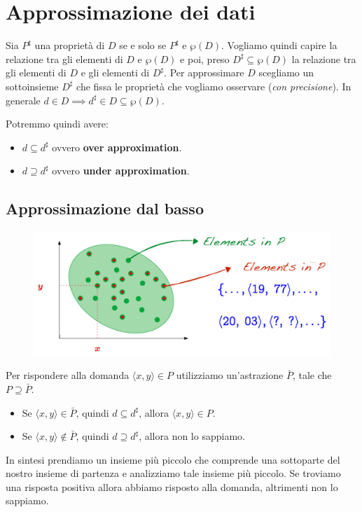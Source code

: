 \section{Approssimazione dei dati}
Sia $P^\sharp$ una proprietà di $D$ se e solo se $P^\sharp$ e $\wp(D)$. Vogliamo quindi capire la relazione tra gli 
elementi di $D$ e $\wp(D)$ e poi, preso $D^\sharp \subseteq \wp(D)$ la relazione tra gli elementi di $D$ e gli elementi 
di $D^\sharp$.
Per approssimare $D$ scegliamo un sottoinsieme $D^\sharp$ che fissa le proprietà che vogliamo osservare (\textit{con precisione}).
In generale $d \in D \implies d^\sharp \in D \subseteq \wp(D)$.

Potremmo quindi avere:
\begin{itemize}
  \item $d \subseteq d^\sharp$ ovvero \textbf{over approximation}.
  \item $d \supseteq d^\sharp$ ovvero \textbf{under approximation}.
\end{itemize}
\subsection{Approssimazione dal basso}
\begin{figure}[H]
  \centering
  \includegraphics[scale=0.5]{img/approx.png}
\end{figure}
Per rispondere alla domanda $\langle x, y \rangle \in P$ utilizziamo un'astrazione $\bar{P}$,
tale che $P \supseteq \bar{P}$.
\begin{itemize}
  \item Se $\langle x, y \rangle \in \bar{P}$, quindi $d \subseteq d^\sharp$, allora $\langle x, y \rangle \in P$.
  \item Se $\langle x, y \rangle \notin \bar{P}$, quindi $d \supseteq d^\sharp$, allora non lo sappiamo.
\end{itemize}
In sintesi prendiamo un insieme più piccolo che comprende una sottoparte del nostro insieme di partenza e
analizziamo tale insieme più piccolo. Se troviamo una risposta positiva allora abbiamo risposto alla domanda,
altrimenti non lo sappiamo.
